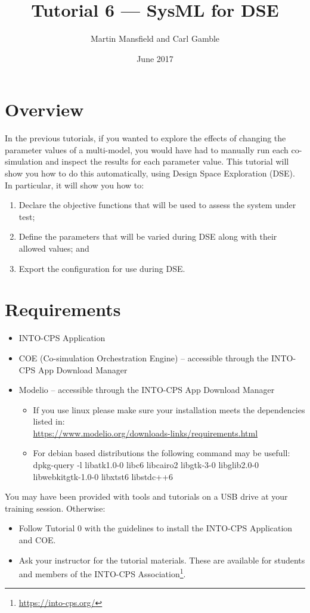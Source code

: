 \documentclass[11pt,a4paper]{../tutorial}
\title{Tutorial 6 --- SysML for DSE}
\date{June 2017}
\author{Martin Mansfield and Carl Gamble}
\begin{document}
\section*{Overview}

In the previous tutorials, if you wanted to explore the effects of changing the parameter values of a multi-model, you would have had to manually run each co-simulation and inspect the results for each parameter value.
This tutorial will show you how to do this automatically, using Design Space Exploration (DSE).
In particular, it will show you how to:

\begin{enumerate}[noitemsep]
\item Declare the objective functions that will be used to assess the system under test;
\item Define the parameters that will be varied during DSE along with their allowed values; and
\item Export the configuration for use during DSE.
\end{enumerate}

\section*{Requirements}

\begin{itemize}[noitemsep]
	\item INTO-CPS Application
	\item COE (Co-simulation Orchestration Engine) -- accessible through the INTO-CPS App Download Manager
	\item Modelio -- accessible through the INTO-CPS App Download Manager
	\begin{small}
		\begin{itemize}
			\item If you use linux please make sure your installation meets the dependencies listed in:\\ \url{https://www.modelio.org/downloads-links/requirements.html}
			\item For debian based distributions the following command may be usefull:\\
			dpkg-query -l  libatk1.0-0 libc6 libcairo2 libgtk-3-0 libglib2.0-0 libwebkitgtk-1.0-0 libxtst6 libstdc++6
		\end{itemize}
	\end{small}
\end{itemize}

You may have been provided with tools and tutorials on a USB drive at your training session. Otherwise: 
\begin{itemize}[noitemsep]
\item Follow Tutorial 0 with the guidelines to install the INTO-CPS Application and COE.
\item Ask your instructor for the tutorial materials. These are available for students and members of the INTO-CPS Association\footnote{\url{https://into-cps.org/}}.
\end{itemize}
\end{document}

